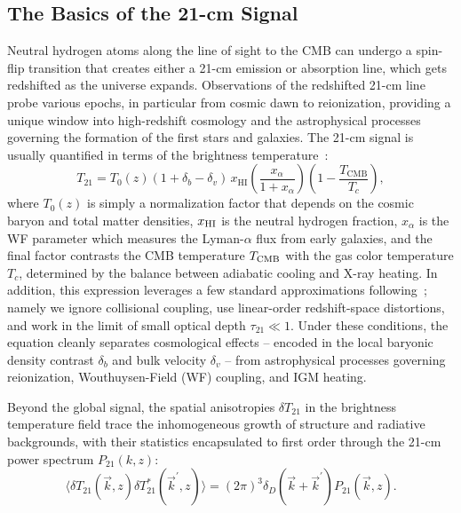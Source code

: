 \subsection{The Basics of the 21-cm Signal}
\noindent Neutral hydrogen atoms along the line of sight to the CMB can undergo a spin-flip transition that creates either a 21-cm emission or absorption line, which gets redshifted as the universe expands. Observations of the redshifted 21-cm line probe various epochs, in particular from cosmic dawn to reionization, providing a unique window into high-redshift cosmology and the astrophysical processes governing the formation of the first stars and galaxies. The 21-cm signal is usually quantified in terms of the brightness temperature~\citep{Furlanetto:2006jb}:
\begin{equation} \label{eq:ch14-T21}
    T_{21}=T_0(z)\left(1+\delta_b-\delta_v\right)\, x_{\mathrm{HI}}\left(\frac{x_\alpha}{1+x_\alpha}\right)\left(1-\frac{T_{\mathrm{CMB}}}{T_c}\right),
\end{equation}
where  $T_0(z)$ is simply a normalization factor that depends on the cosmic baryon and total matter densities, $x_{\rm HI}$ is the neutral hydrogen fraction, $x_\alpha$ is the WF parameter which measures the Lyman-$\alpha$ flux from early galaxies, and the final factor contrasts the CMB temperature $T_{\rm CMB}$ with the gas color temperature $T_c$, determined by the balance between adiabatic cooling and X-ray heating. In addition, this expression leverages a few standard approximations following~\citep{munoz23,munoz23b,Cruz:2024fsv}; namely we ignore collisional coupling, use linear-order redshift-space distortions, and work in the limit of small optical depth $\tau_{21} \ll 1$. Under these conditions, the equation cleanly separates cosmological effects -- encoded in the local baryonic density contrast $\delta_b$ and bulk velocity $\delta_v$ --
from astrophysical processes governing reionization, Wouthuysen-Field (WF) coupling, and IGM heating.

Beyond the global signal, the spatial anisotropies $\delta T_{21}$ in the brightness temperature field trace the inhomogeneous growth of structure and radiative backgrounds, with their statistics encapsulated to first order through the 21-cm power spectrum $P_{21}(k, z)$:
\begin{equation}
    \langle \delta T_{21}(\vec{k}, z)\delta T^*_{21}(\vec{k}^\prime,z)\rangle= (2\pi)^3\delta_D(\vec{k} + \vec{k}^\prime) P_{21}(\vec{k}, z).
\end{equation}


